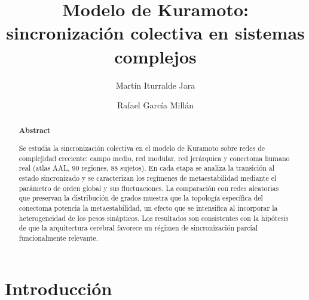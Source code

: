 \documentclass[
  reprint,
  amsmath,amssymb,
  aps,
  pra,
]{revtex4-2}
\begin{document}
\title{Modelo de Kuramoto: sincronización colectiva en sistemas complejos}

\author{Martín Iturralde Jara}
\author{Rafael García Millán}

\date{\Today}

\begin{abstract}

\vspace{0.25cm}

\begin{center}
    \textbf{Abstract}
\end{center}

Se estudia la sincronización colectiva en el modelo de Kuramoto sobre redes de complejidad creciente: campo medio, red modular, red jerárquica y conectoma humano real (atlas AAL, 90 regiones, 88 sujetos). En cada etapa se analiza la transición al estado sincronizado y se caracterizan los regímenes de metaestabilidad mediante el parámetro de orden global y sus fluctuaciones. La comparación con redes aleatorias que preservan la distribución de grados muestra que la topología específica del conectoma potencia la metaestabilidad, un efecto que se intensifica al incorporar la heterogeneidad de los pesos sinápticos. Los resultados son consistentes con la hipótesis de que la arquitectura cerebral favorece un régimen de sincronización parcial funcionalmente relevante.
\end{abstract}

\maketitle


\onecolumngrid

\vspace{-1cm}

\section{Introducción}
\label{sec:intro}
\end{document}
